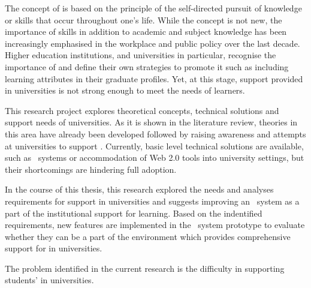 The concept of \LLLs is based on the principle of the self-directed pursuit of
knowledge or skills that occur throughout one's life. While the concept is not
new, the importance of \LLLs skills in addition to academic and subject
knowledge has been increasingly emphasised in the workplace and public policy
over the last decade. Higher education institutions, and universities in
particular, recognise the importance of \LLLs and define their own strategies to
promote it such as including learning attributes in their graduate profiles.
Yet, at this stage, \LLLs support provided in universities is not strong enough
to meet the needs of learners.

This research project explores theoretical concepts, technical solutions and
\LLLs support needs of universities. As it is shown in the literature review,
theories in this area have already been developed followed by raising awareness
and attempts at universities to support \LLLsn. Currently, basic level technical
solutions are available, such as \ep~systems or accommodation of Web 2.0 tools
into university settings, but their shortcomings are hindering full adoption.

In the course of this thesis, this research explored the needs and analyses
requirements for \LLL support in universities and suggests improving an
\ep~system as a part of the institutional support for learning. Based on the
indentified requirements, new features are implemented in the \ep~system
prototype to evaluate whether they can be a part of the environment which
provides comprehensive support for \LLLs in universities.


The problem identified in the current research is the difficulty in supporting
students' \LLLs in universities.